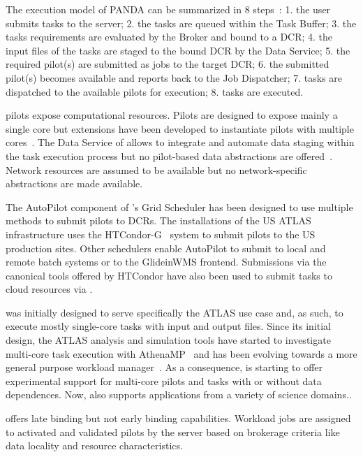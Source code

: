\documentclass{sig-alternate}
\begin{document}
The execution model of PANDA can be summarized in 8
steps~\cite{nilsson2011atlas,pandarun_url}: 1. the user submits tasks to the
\panda server; 2. the tasks are queued within the Task Buffer; 3. the tasks
requirements are evaluated by the Broker and bound to a DCR; 4. the input files
of the tasks are staged to the bound DCR by the Data Service; 5. the required
pilot(s) are submitted as jobs to the target DCR; 6. the submitted pilot(s)
becomes available and reports back to the Job Dispatcher; 7. tasks are
dispatched to the available pilots for execution; 8. tasks are executed.


\panda pilots expose computational resources. Pilots are designed to expose
mainly a single core but extensions have been developed to instantiate pilots
with multiple cores~\cite{crooks2012multi}. The Data Service of \panda allows to
integrate and automate data staging within the task execution process but no
pilot-based data abstractions are offered~\cite{maeno2012pd2p}. Network
resources are assumed to be available but no network-specific abstractions are
made available.

The AutoPilot component of \panda's Grid Scheduler has been designed to use
multiple methods to submit pilots to DCRs. The \panda installations of the US
ATLAS infrastructure uses the HTCondor-G~\cite{frey2002condorG} system to submit
pilots to the US production sites. Other schedulers enable AutoPilot to submit
to local and remote batch systems or to the GlideinWMS frontend. Submissions via
the canonical tools offered by HTCondor have also been used to submit tasks to
cloud resources via \panda.

\panda was initially designed to serve specifically the ATLAS use case and, as
such, to execute mostly single-core tasks with input and output files. Since its
initial design, the ATLAS analysis and simulation tools have started to
investigate multi-core task execution with AthenaMP~\cite{crooks2012multi} and
\panda has been evolving towards a more general purpose workload
manager~\cite{schovancova2014next,schovancova2013panda,borodin2015scaling}. As a
consequence, \panda is starting to offer experimental support for multi-core
pilots and tasks with or without data dependences. Now, \panda also supports
applications from a variety of science domains.\cite{maeno2014evolution}.

\panda offers late binding but not early binding capabilities. Workload jobs are
assigned to activated and validated pilots by the \panda server based on
brokerage criteria like data locality and resource characteristics.
\end{document}
